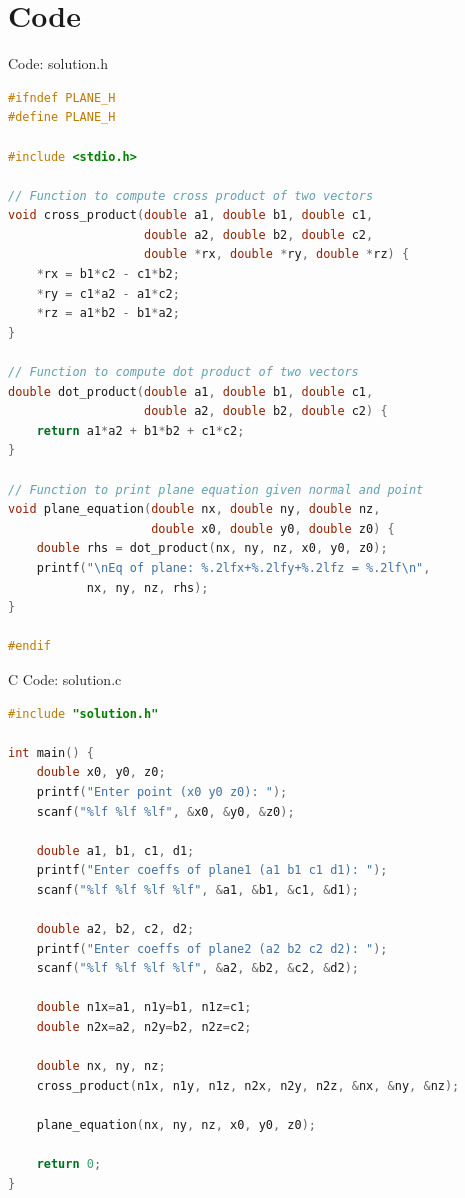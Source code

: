 \documentclass{beamer}
\numberwithin{equation}{section}
\theoremstyle{remark}
\begin{document}
\section{Code}
\begin{frame}[fragile]{Code: solution.h}
\begin{lstlisting}[language=C]
#ifndef PLANE_H
#define PLANE_H

#include <stdio.h>

// Function to compute cross product of two vectors
void cross_product(double a1, double b1, double c1,
                   double a2, double b2, double c2,
                   double *rx, double *ry, double *rz) {
    *rx = b1*c2 - c1*b2;
    *ry = c1*a2 - a1*c2;
    *rz = a1*b2 - b1*a2;
}

// Function to compute dot product of two vectors
double dot_product(double a1, double b1, double c1,
                   double a2, double b2, double c2) {
    return a1*a2 + b1*b2 + c1*c2;
}

// Function to print plane equation given normal and point
void plane_equation(double nx, double ny, double nz,
                    double x0, double y0, double z0) {
    double rhs = dot_product(nx, ny, nz, x0, y0, z0);
    printf("\nEq of plane: %.2lfx+%.2lfy+%.2lfz = %.2lf\n",
           nx, ny, nz, rhs);
}

#endif
\end{lstlisting}
\end{frame}

\begin{frame}[fragile]{C Code: solution.c}
\begin{lstlisting}[language=C]
#include "solution.h"

int main() {
    double x0, y0, z0;
    printf("Enter point (x0 y0 z0): ");
    scanf("%lf %lf %lf", &x0, &y0, &z0);

    double a1, b1, c1, d1;
    printf("Enter coeffs of plane1 (a1 b1 c1 d1): ");
    scanf("%lf %lf %lf %lf", &a1, &b1, &c1, &d1);

    double a2, b2, c2, d2;
    printf("Enter coeffs of plane2 (a2 b2 c2 d2): ");
    scanf("%lf %lf %lf %lf", &a2, &b2, &c2, &d2);

    double n1x=a1, n1y=b1, n1z=c1;
    double n2x=a2, n2y=b2, n2z=c2;

    double nx, ny, nz;
    cross_product(n1x, n1y, n1z, n2x, n2y, n2z, &nx, &ny, &nz);

    plane_equation(nx, ny, nz, x0, y0, z0);

    return 0;
}
\end{lstlisting}
\end{frame}
\end{document}
